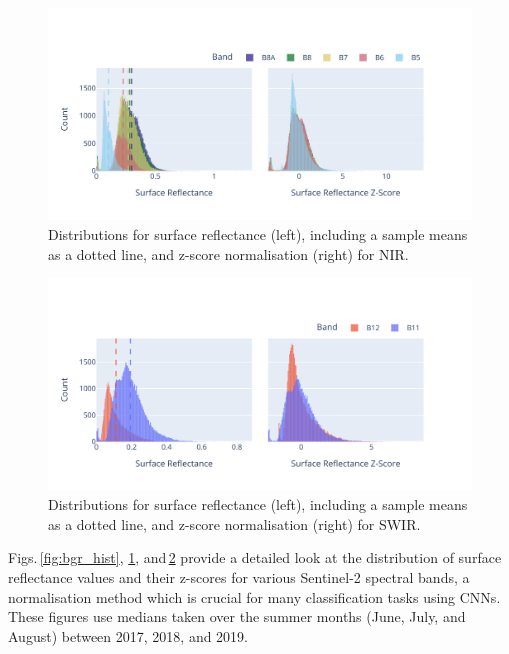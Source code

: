 \begin{figure}[ht]
    \centering
    \includegraphics[width=0.98\linewidth, trim={15pt 25pt 10pt 50pt}, clip]{figures/figures_features/nir_hist.pdf}
    \caption{Distributions for surface reflectance (left), including a sample means as a dotted line, 
    and z-score normalisation (right) for NIR.}
    \label{fig:nir_hist}
\end{figure}

\begin{figure}[ht]
    \centering
    \includegraphics[width=0.98\linewidth, trim={15pt 25pt 10pt 50pt}, clip]{figures/figures_features/swir_hist.pdf}
    \caption{Distributions for surface reflectance (left), including a sample means as a dotted line, 
    and z-score normalisation (right) for SWIR.}
    \label{fig:swir_hist}
\end{figure}

Figs.\,\ref{fig:bgr_hist}, \ref{fig:nir_hist}, and\,\ref{fig:swir_hist} provide a detailed look at the distribution of surface reflectance values and their z-scores for various Sentinel-2 spectral bands, a normalisation method which is crucial for many classification tasks using CNNs. These figures use medians taken over the summer months (June, July, and August) between 2017, 2018, and 2019.

